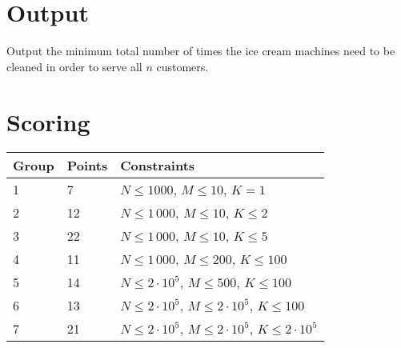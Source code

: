 \section*{Output}
Output the minimum total number of times the ice cream machines need to be
cleaned in order to serve all $n$ customers.

\section*{Scoring}
\begin{tabular}{|l|l|l|}
    \hline
    Group & Points & Constraints \\ \hline
    1     &  7   & $N \leq 1000$,          $M \leq 10$, $K = 1$ \\ \hline %
    2     &  12  & $N \leq 1\,000$,          $M \leq 10$, $K \leq 2$ \\ \hline %
    3     &  22  & $N \leq 1\,000$,          $M \leq 10$, $K \leq 5$ \\ \hline %
    4     &  11  & $N \leq 1\,000$,         $M \leq 200$, $K \leq 100$ \\ \hline %
    5     &  14  & $N \leq 2 \cdot 10^5$, $M \leq 500$, $K \leq 100$ \\ \hline %
    6     &  13  & $N \leq 2 \cdot 10^5$, $M \leq 2 \cdot 10^5$, $K \leq 100$ \\ \hline %
    7     &  21  & $N \leq 2 \cdot 10^5$, $M \leq 2 \cdot 10^5$, $K \leq 2 \cdot 10^5$ \\ \hline %
\end{tabular}

